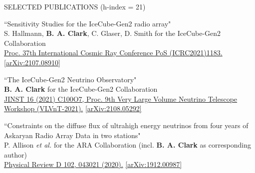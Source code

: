 \documentclass{resume} %
\begin{document}
\begin{rSection}{SELECTED PUBLICATIONS (h-index = 21)}
\begin{etaremune}
  \item ``Sensitivity Studies for the IceCube-Gen2 radio array" \\
 S. Hallmann, \textbf{B. A. Clark}, C. Glaser, D. Smith for the IceCube-Gen2 Collaboration \\ \href{https://doi.org/10.22323/1.395.1183}{Proc. 37th International Cosmic Ray Conference PoS (ICRC2021)1183.}  \href{https://arxiv.org/abs/2107.08910}{[arXiv:2107.08910]}


\item ``The IceCube-Gen2 Neutrino Observatory" \\
\textbf{B. A. Clark} for the IceCube-Gen2 Collaboration \\ \href{https://doi.org/10.1088/1748-0221/16/10/C10007}{JINST 16 (2021) C100O7, Proc. 9th Very Large Volume Neutrino Telescope Workshop (VLVnT-2021).}  \href{https://arxiv.org/abs/2108.05292}{[arXiv:2108.05292]}



  \item ``Constraints on the diffuse flux of ultrahigh energy neutrinos from four years of Askaryan Radio Array Data in two stations" \\
 P. Allison {\it et al.} for the ARA Collaboration (incl. \textbf{B. A. Clark} as corresponding author)\\ \href{https://doi.org/10.1103/PhysRevD.102.043021}{Physical Review D 102, 043021 (2020).}  \href{https://arxiv.org/abs/1912.00987}{[arXiv:1912.00987]}



\end{etaremune}
\end{rSection}
\end{document}
